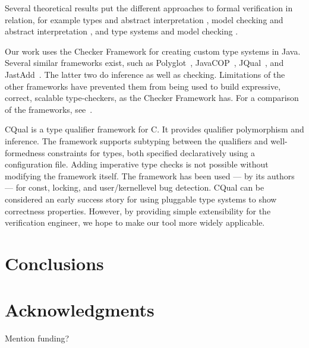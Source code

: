 \documentclass[preprint]{sig-alternate}
\begin{document}
Several theoretical results put the different approaches to formal
verification in relation, for example
types and abstract interpretation
\cite{Cousot1997},
model checking and abstract interpretation
\cite{CousotCousot2000},
and type systems and model checking
\cite{NaikPalsberg2005}.




Our work uses the Checker Framework for creating custom type systems in
Java.  Several similar frameworks exist, such as
Polyglot~\cite{NystromCM2003},
JavaCOP~\cite{MarkstrumMEMAN2010,AndreaeNMM2006},
JQual~\cite{GreenfieldboyceF2007}, and
JastAdd~\cite{EkmanH2007:JastAdd}.
The latter two do inference as well as checking.
Limitations of the other frameworks have prevented them from being used to
build expressive, correct, scalable type-checkers, as the Checker Framework has.
For a comparison of the frameworks, see~\cite{PapiACPE2008}.

CQual \cite{FosterFFA99,foster:pldi02}
is a type qualifier framework for C.
It provides qualifier polymorphism and inference.
The framework supports subtyping between the qualifiers and
well-formedness constraints for types, both specified declaratively
using a configuration file. Adding imperative type checks is not
possible without modifying the framework itself.
The framework has been used --- by its authors --- for const, locking, and
user/ker\-nel\discretionary{-}{}{}level bug detection.
CQual can be considered an early success story for using pluggable
type systems to show correctness properties.
However, by providing simple extensibility for the verification
engineer, we hope to make our tool more widely applicable.



\section{Conclusions}


\section{Acknowledgments}

Mention funding?







\balancecolumns
\end{document}
